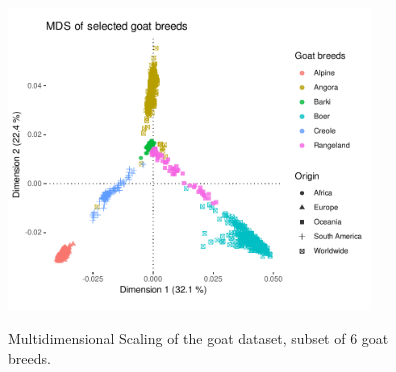 \documentclass[a4paper,onecolumn,12pt]{article}
\begin{document}
\begin{twocolumn}
    \begin{figure}
        \centering
        \includegraphics[height=8cm]{../Figures/goat_mds_filtered.pdf}
        \label{fig:gwas_PCA}
        \caption{Multidimensional Scaling of the goat dataset, subset of 6 goat breeds.}
    \end{figure}

\end{twocolumn}
\end{document}

